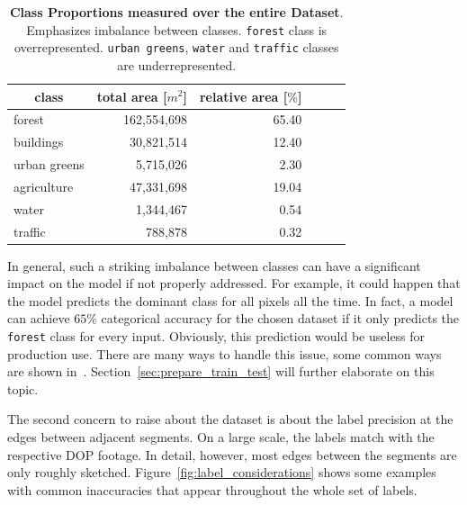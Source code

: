 \begin{table}[h]
\centering
\caption[Class Proportions measured over the entire Dataset]
{\textbf{Class Proportions measured over the entire Dataset}. Emphasizes imbalance between classes. \texttt{forest} class is overrepresented. \texttt{urban greens}, \texttt{water} and \texttt{traffic} classes are underrepresented.}
\label{tab:seg-breakdown}
\begin{tabular}{|l|r|r|r|r|r|}
\hline
\multicolumn{1}{|c|}{\textbf{class}} &
  \multicolumn{1}{c|}{\textbf{total area [$m^2$]}} &
  \multicolumn{1}{c|}{\textbf{relative area [$\%$]}} \\ \hline
forest       & 162,554,698 & 65.40  \\ \hline
buildings    & 30,821,514  & 12.40  \\ \hline
urban greens & 5,715,026   & 2.30   \\ \hline
agriculture  & 47,331,698  & 19.04  \\ \hline
water        & 1,344,467   & 0.54   \\ \hline
traffic      & 788,878     & 0.32   \\ \hline
\end{tabular}
\end{table}

In general, such a striking imbalance between classes can have a significant impact on the model if not properly addressed. For example, it could happen that the model predicts the dominant class for all pixels all the time. In fact, a model can achieve $65\%$ categorical accuracy for the chosen dataset if it only predicts the \texttt{forest} class for every input. Obviously, this prediction would be useless for production use. There are many ways to handle this issue, some common ways are shown in~\cite{imbalanced_data09}. Section~\ref{sec:prepare_train_test} will further elaborate on this topic.

The second concern to raise about the dataset is about the label precision at the edges between adjacent segments. On a large scale, the labels match with the respective DOP footage. In detail, however, most edges between the segments are only roughly sketched. Figure~\ref{fig:label_considerations} shows some examples with common inaccuracies that appear throughout the whole set of labels.

